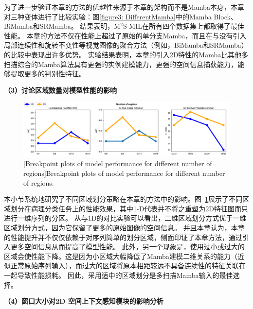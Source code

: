 为了进一步验证本章的方法的优越性来源于本章的架构而不是Mamba本身，本章对三种变体进行了比较实验：图\ref{figure3: DifferentMamba}中的Mamba Block、BiMamba和SRMamba。
结果表明，M$^2$S-MIL在所有四个数据集上都取得了最佳性能。
本章的方法不仅在性能上超过了原始的单分支Mamba，而且在与没有引入局部连续性和旋转不变性等视觉图像的聚合方法（例如，BiMamba和SRMamba）的比较中表现出许多优势。
实验结果表明，本章的引入2D特性的Mamba比其他多扫描综合的Mamba算法具有更强的实例建模能力，更强的空间信息捕获能力，能够提取更多的判别性特征。



\textbf{（3）讨论区域数量对模型性能的影响}

\begin{figure}[ht]
  \centering
  \includegraphics[width=1.0\columnwidth]{figures/区域个数.png}
  [Breakpoint plots of model performance for different number of regions]{Breakpoint plots of model performance for different number of regions.}
  \label{figure3: NumOfRegion}
\end{figure}

本小节系统地研究了不同区域划分策略在本章的方法中的影响。图~\ref{figure3: NumOfRegion}展示了不同区域划分在病理分类任务上的性能效果，其中1-D代表并不将之重塑为2D特征图而只进行一维序列的分区。
从与1D的对比实验可以看出，二维区域划分方式优于一维区域划分方式，因为它保留了更多的原始图像的空间信息。
并且本章认为，本章的性能提升并不仅仅依赖于对序列简单的划分区域，侧面印证了本章方法，通过引入更多空间信息从而提高了模型性能。
此外，另一个现象是，使用过小或过大的区域会使性能下降。这是因为小区域大幅降低了Mamba建模二维关系的能力（近似正常原始序列输入），而过大的区域将原本相距较远不具备连续性的特征关联在一起导致性能损耗。
因此，采用适中的区域划分是多扫描Mamba输入的最佳选择。


\textbf{（4）窗口大小对2D 空间上下文感知模块的影响分析}


